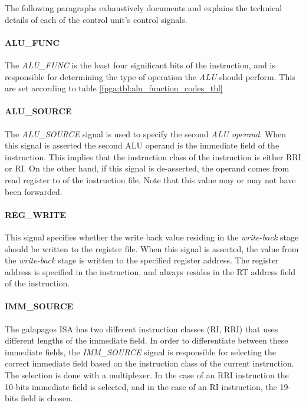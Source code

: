 


The following paragraphs exhaustively documents and explains the technical details of each of the control unit's control signals.

\paragraph{ALU\_FUNC}
The \emph{ALU\_FUNC} is the least four significant bits of the instruction, and is responsible for determining the type of operation the \emph{ALU} should perform.
This are set according to table \ref{fpga:tbl:alu_function_codes_tbl} 



\paragraph{ALU\_SOURCE}
The \emph{ALU\_SOURCE} signal is used to specify the second \emph{ALU operand}.
When this signal is asserted the second ALU operand is the immediate field of the instruction.
This implies that the instruction class of the instruction is either RRI or RI.
On the other hand, if this signal is de-asserted, the operand comes from read register to of the instruction file. Note that this value may or may not have been forwarded. 

\paragraph{REG\_WRITE}
This signal specifies whether the write back value residing in the \emph{write-back} stage should be written to the register file.
When this signal is asserted, the value from the \emph{write-back} stage is written to the specified register address.
The register address is specified in the instruction, and always resides in the RT address field of the instruction.

\paragraph{IMM\_SOURCE}
The \Gls{galapagos} ISA has two different instruction classes (RI, RRI) that uses different lengths of the immediate field.
In order to differentiate between these immediate fields, the \emph{IMM\_SOURCE} signal is responsible for selecting the correct immediate field based on the instruction class of the current instruction.
The selection is done with a multiplexer.
In the case of an RRI instruction the 10-bits immediate field is selected, and in the case of an RI instruction, the 19-bits field is chosen.

